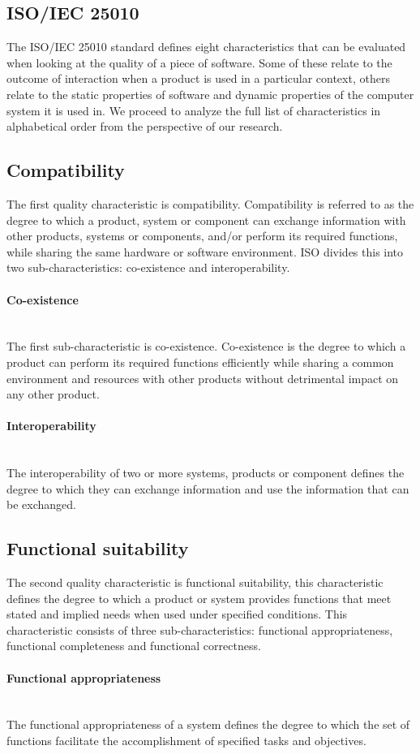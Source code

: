 \documentclass[twoside]{uva-inf-bachelor-thesis}
\newcommand{\myparagraph}[1]{\paragraph{#1}\mbox{}\\}
\begin{document}
\subsection{ISO/IEC 25010}
The ISO/IEC 25010 standard defines eight characteristics that can be evaluated when looking at the quality of a piece of software. Some of these relate to the outcome of interaction when a product is used in a particular context, others relate to the static properties of software and dynamic properties of the computer system it is used in. We proceed to analyze the full list of characteristics in alphabetical order from the perspective of our research.

\subsection{Compatibility}
The first quality characteristic is compatibility. Compatibility is referred to as the degree to which a product, system or component can exchange information with other products, systems or components, and/or perform its required functions, while sharing the same hardware or software environment. ISO divides this into two sub-characteristics: co-existence and interoperability.

\myparagraph{Co-existence}
The first sub-characteristic is co-existence. Co-existence is the degree to which a product can perform its required functions efficiently while sharing a common environment and resources with other products without detrimental impact on any other product.

\myparagraph{Interoperability}
The interoperability of two or more systems, products or component defines the degree to which they can exchange information and use the information that can be exchanged.

\subsection{Functional suitability}
The second quality characteristic is functional suitability, this characteristic defines the degree to which a product or system provides functions that meet stated and implied needs when used under specified conditions. This characteristic consists of three sub-characteristics: functional appropriateness, functional completeness and functional correctness.

\myparagraph{Functional appropriateness}
The functional appropriateness of a system defines the degree to which the set of functions facilitate the accomplishment of specified tasks and objectives.
\end{document}
